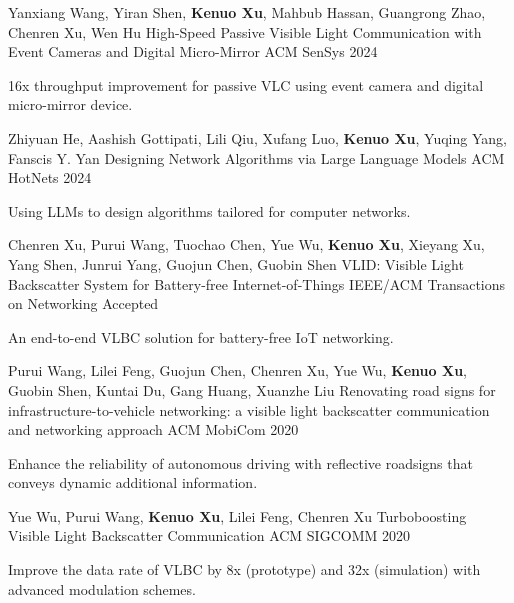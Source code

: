 \documentclass[11pt, a4paper]{awesome-cv}
\begin{document}
\begin{cventries}
	\cventry
	{Yanxiang Wang, Yiran Shen, \textbf{Kenuo Xu}, Mahbub Hassan, Guangrong Zhao, Chenren Xu, Wen Hu}
	{High-Speed Passive Visible Light Communication with Event Cameras and Digital Micro-Mirror}
	{ACM SenSys}
	{2024}
	{
		\begin{cvitems} %
			\item {16x throughput improvement for passive VLC using event camera and digital micro-mirror device.}
		\end{cvitems}
	}
	
	\cventry
	{Zhiyuan He, Aashish Gottipati, Lili Qiu, Xufang Luo, \textbf{Kenuo Xu}, Yuqing Yang, Fanscis Y. Yan}
	{Designing Network Algorithms via Large Language Models}
	{ACM HotNets}
	{2024}
	{
		\begin{cvitems} %
			\item {Using LLMs to design algorithms tailored for computer networks.}
		\end{cvitems}
	}

	\cventry
	{Chenren Xu, Purui Wang, Tuochao Chen, Yue Wu, \textbf{Kenuo Xu}, Xieyang Xu, Yang Shen, Junrui Yang, Guojun Chen, Guobin Shen}
	{VLID: Visible Light Backscatter System for Battery-free Internet-of-Things}
	{IEEE/ACM Transactions on Networking}
	{Accepted}
	{
		\begin{cvitems} %
			\item {An end-to-end VLBC solution for battery-free IoT networking.}
		\end{cvitems}
	}
	
	\cventry
	{Purui Wang, Lilei Feng, Guojun Chen, Chenren Xu, Yue Wu, \textbf{Kenuo Xu}, Guobin Shen, Kuntai Du, Gang Huang, Xuanzhe Liu}
	{Renovating road signs for infrastructure-to-vehicle networking: a visible light backscatter communication and networking approach}
	{ACM MobiCom}
	{2020}
	{
		\begin{cvitems} %
			\item {Enhance the reliability of autonomous driving with reflective roadsigns that conveys dynamic additional information.}
		\end{cvitems}
	}
	
	\cventry
	{Yue Wu, Purui Wang, \textbf{Kenuo Xu}, Lilei Feng, Chenren Xu}
	{Turboboosting Visible Light Backscatter Communication}
	{ACM SIGCOMM}
	{2020}
	{
		\begin{cvitems} %
			\item {Improve the data rate of VLBC by 8x (prototype) and 32x (simulation) with advanced modulation schemes.}
		\end{cvitems}
	}
	
	
\end{cventries}
\end{document}
